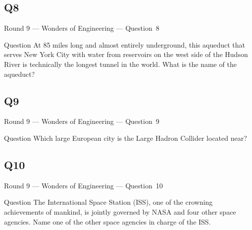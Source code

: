 \documentclass[11pt]{beamer}
\begin{document}
\subsection*{Q8}
\begin{frame}[t]{Round 9 --- Wonders of Engineering --- \mbox{Question 8}}
    \vspace{-0.5em}
    \begin{block}{Question}
        At 85 miles long and almost entirely underground, this aqueduct that serves New York City with water from reservoirs on the west side of the Hudson River is technically the longest tunnel in the world. What is the name of the aqueduct?
    \end{block}
\end{frame}
\subsection*{Q9}
\begin{frame}[t]{Round 9 --- Wonders of Engineering --- \mbox{Question 9}}
    \vspace{-0.5em}
    \begin{block}{Question}
        Which large European city is the Large Hadron Collider located near?
    \end{block}
\end{frame}
\subsection*{Q10}
\begin{frame}[t]{Round 9 --- Wonders of Engineering --- \mbox{Question 10}}
    \vspace{-0.5em}
    \begin{block}{Question}
        The International Space Station (ISS), one of the crowning achievements of mankind, is jointly governed by NASA and four other space agencies. Name one of the other space agencies in charge of the ISS.\@
    \end{block}
\end{frame}
\end{document}
